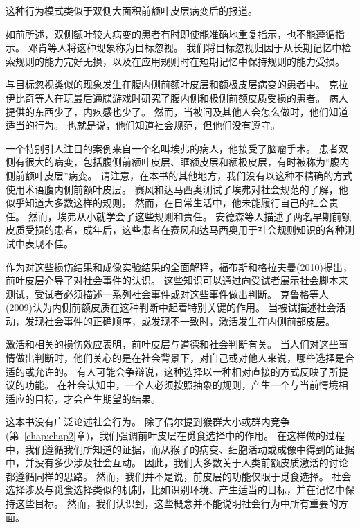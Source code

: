 这种行为模式类似于双侧大面积前额叶皮层病变后的报道。


如前所述，双侧额叶较大病变的患者有时即使能准确地重复指示，也不能遵循指示。
邓肯等人\cite{duncan2008goal}将这种现象称为目标忽视。
我们将目标忽视归因于从长期记忆中检索规则的能力完好无损，以及在应用规则时在短期记忆中保持规则的能力受损。


与目标忽视类似的现象发生在腹内侧前额叶皮层和额极皮层病变的患者中。
克拉伊比奇等人\cite{krajbich2009economic}在玩最后通牒游戏时研究了腹内侧和极侧前额皮质受损的患者。
病人提供的东西少了，内疚感也少了。
然而，当被问及其他人会怎么做时，他们知道适当的行为。
也就是说，他们知道社会规范，但他们没有遵守。


一个特别引人注目的案例来自一个名叫埃弗的病人，他接受了脑瘤手术。
患者双侧有很大的病变，包括腹侧前额叶皮层、眶额皮层和额极皮层，有时被称为“腹内侧前额叶皮层”病变。
请注意，在本书的其他地方，我们没有以这种不精确的方式使用术语腹内侧前额叶皮层。
赛风和达马西奥\cite{saver1991preserved}测试了埃弗对社会规范的了解，他似乎知道大多数这样的规则。
然而，在日常生活中，他未能履行自己的社会责任\cite{eslinger1985severe}。
然而，埃弗从小就学会了这些规则和责任。
安德森等人\cite{anderson2013impairment}描述了两名早期前额皮质受损的患者，成年后，这些患者在赛风和达马西奥\cite{saver1991preserved}用于社会规则知识的各种测试中表现不佳。


作为对这些损伤结果和成像实验结果的全面解释，福布斯和格拉夫曼(2010)提出，前叶皮层介导了对社会事件的认识。
这些知识可以通过向受试者展示社会脚本来测试，受试者必须描述一系列社会事件或对这些事件做出判断。
克鲁格等人(2009)认为内侧前额皮质在这种判断中起着特别关键的作用。
当被试描述社会活动，发现社会事件的正确顺序，或发现不一致时，激活发生在内侧前部皮层。


激活和相关的损伤效应表明，前叶皮层与道德和社会判断有关。
当人们对这些事情做出判断时，他们关心的是在社会背景下，对自己或对他人来说，哪些选择是合适的或允许的。
有人可能会争辩说，这种选择以一种相对直接的方式反映了所提议的功能。
在社会认知中，一个人必须按照抽象的规则，产生一个与当前情境相适应的目标，才会产生期望的结果。


这本书没有广泛论述社会行为。
除了偶尔提到猴群大小或群内竞争(第~\ref{chap:chap2}章)，我们强调前叶皮层在觅食选择中的作用。
在这样做的过程中，我们遵循我们所知道的证据，而从猴子的病变、细胞活动或成像中得到的证据中，并没有多少涉及社会互动。
因此，我们大多数关于人类前额皮质激活的讨论都遵循同样的思路。
然而，我们并不是说，前皮层的功能仅限于觅食选择。
社会选择涉及与觅食选择类似的机制，比如识别环境、产生适当的目标，并在记忆中保持这些目标。
然而，我们认识到，这些概念并不能说明社会行为中所有重要的方面。


